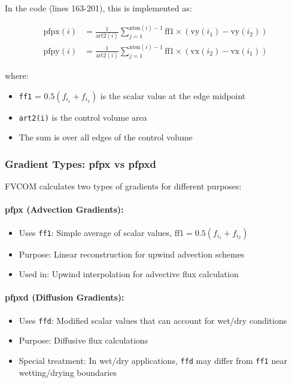 \documentclass[11pt,a4paper]{article}
\begin{document}
In the code (lines 163-201), this is implemented as:

\begin{align}
\text{pfpx}(i) &= \frac{1}{\text{art2}(i)} \sum_{j=1}^{\text{ntsn}(i)-1} \text{ff1} \times (\text{vy}(i_1) - \text{vy}(i_2)) \\
\text{pfpy}(i) &= \frac{1}{\text{art2}(i)} \sum_{j=1}^{\text{ntsn}(i)-1} \text{ff1} \times (\text{vx}(i_2) - \text{vx}(i_1))
\end{align}

where:
\begin{itemize}
\item \texttt{ff1} = $0.5(f_{i_1} + f_{i_2})$ is the scalar value at the edge midpoint
\item \texttt{art2(i)} is the control volume area
\item The sum is over all edges of the control volume
\end{itemize}

\subsubsection{Gradient Types: pfpx vs pfpxd}

FVCOM calculates two types of gradients for different purposes:

\paragraph{pfpx (Advection Gradients):}
\begin{itemize}
\item Uses \texttt{ff1}: Simple average of scalar values, $\text{ff1} = 0.5(f_{i_1} + f_{i_2})$
\item Purpose: Linear reconstruction for upwind advection schemes
\item Used in: Upwind interpolation for advective flux calculation
\end{itemize}

\paragraph{pfpxd (Diffusion Gradients):}
\begin{itemize}
\item Uses \texttt{ffd}: Modified scalar values that can account for wet/dry conditions
\item Purpose: Diffusive flux calculations
\item Special treatment: In wet/dry applications, \texttt{ffd} may differ from \texttt{ff1} near wetting/drying boundaries
\end{itemize}
\end{document}
